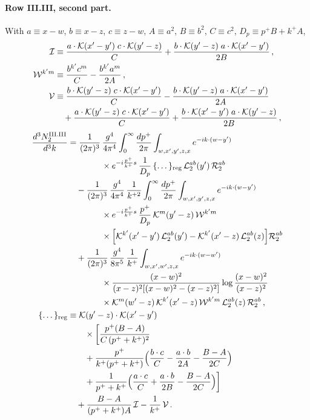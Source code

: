 \paragraph{Row III.III, second part.} With $a\equiv x-w$, $b\equiv x-z$, $c\equiv z-w$, $A\equiv a^2$, $B\equiv b^2$, $C\equiv c^2$, $D_p\equiv p^+B+k^+A$,
\begin{align}\label{eq:app_IJW}
\mathcal I&\equiv\frac{a\cdot\mathcal{K}(x'-y')\;c\cdot\mathcal{K}(y'-z)}{C}+\frac{b\cdot\mathcal{K}(y'-z)\;a\cdot\mathcal{K}(x'-y')}{2B}\,,\notag\\
\mathcal W^{k'm}&\equiv\frac{b^{k'}c^m}{C}-\frac{b^{k'}a^m}{2A}\,,\notag\\
\mathcal V&\equiv\frac{b\cdot\mathcal{K}(y'-z)\;c\cdot\mathcal{K}(x'-y')}{C}-\frac{b\cdot\mathcal{K}(y'-z)\;a\cdot\mathcal{K}(x'-y')}{2A}\notag\\&\quad+\frac{a\cdot\mathcal{K}(y'-z)\;c\cdot\mathcal{K}(x'-y')}{C}+\frac{b\cdot\mathcal{K}(x'-y')\;a\cdot\mathcal{K}(y'-z)}{2B}\,,
\end{align}
\begin{align}\label{eq:app_III32}
\frac{d^3N^{\rm III.III}_2}{d^3k}&=\frac{1}{(2\pi)^3}\,\frac{g^4}{4\pi^4}\int_0^\infty\frac{dp^+}{2\pi}\int_{w,x',y',z,x}e^{-ik\cdot(w-y')}\notag\\&\qquad\qquad\times e^{-i\frac{p^+}{k^+}s}\,\frac{1}{D_p}\,\{\dots\}_{\rm reg}\,\mathcal L_2^{ab}(y')\,\mathcal R_2^{ab}\notag\\
&\quad-\frac{1}{(2\pi)^3}\,\frac{g^4}{4\pi^4}\,\frac{1}{k^{+2}}\int_0^\infty\frac{dp^+}{2\pi}\int_{w,x',y',z,x}e^{-ik\cdot(w-y')}\notag\\&\qquad\qquad\times e^{-i\frac{p^+}{k^+}s}\,\frac{p^+}{D_p}\,\mathcal{K}^m(y'-z)\,\mathcal W^{k'm}\notag\\
&\qquad\qquad\times\Big[\mathcal{K}^{k'}(x'-y')\,\mathcal L_2^{ab}(y')-\mathcal{K}^{k'}(x'-z)\,\mathcal L_2^{ab}(z)\Big]\mathcal R_2^{ab}\notag\\
&\quad+\frac{1}{(2\pi)^3}\,\frac{g^4}{8\pi^5}\,\frac{1}{k^+}\int_{w,x',w',z,x}e^{-ik\cdot(w-w')}\notag\\&\qquad\qquad\times\frac{(x-w)^2}{(x-z)^2[(x-w)^2-(x-z)^2]}\log\frac{(x-w)^2}{(x-z)^2}\notag\\&\qquad\qquad\times\mathcal{K}^m(w'-z)\,\mathcal{K}^{k'}(x'-z)\,\mathcal W^{k'm}\,\mathcal L_2^{ab}(z)\,\mathcal R_2^{ab}\,,\notag\\
\{\dots\}_{\rm reg}&\equiv\mathcal{K}(y'-z)\cdot\mathcal{K}(x'-y')\notag\\&\qquad\times\bigg[\frac{p^+(B-A)}{C\,(p^++k^+)^2}\notag\\&\qquad+\frac{p^+}{k^+(p^++k^+)}\Big(\frac{b\cdot c}{C}-\frac{a\cdot b}{2A}-\frac{B-A}{2C}\Big)\notag\\
&\qquad+\frac{1}{p^++k^+}\Big(\frac{a\cdot c}{C}+\frac{a\cdot b}{2B}-\frac{B-A}{2C}\Big)\bigg]\notag\\&\quad+\frac{B-A}{(p^++k^+)A}\,\mathcal I-\frac{1}{k^+}\,\mathcal V\,.
\end{align}
